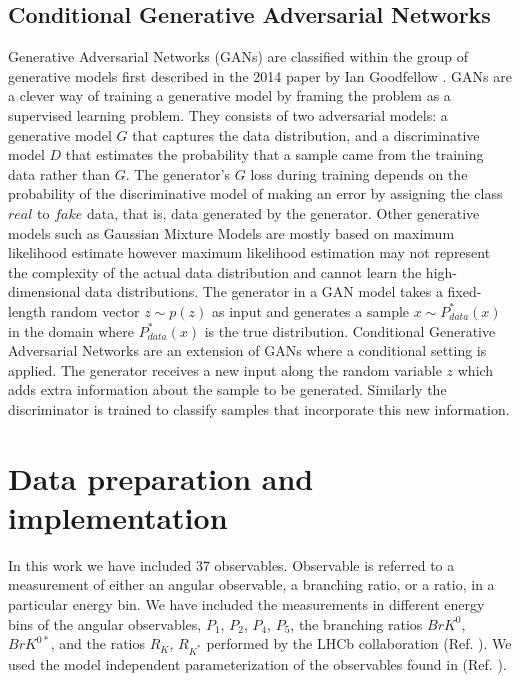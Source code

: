\documentclass[a4paper,fleqn]{cas-dc}
\begin{document}
\subsection{Conditional Generative Adversarial Networks}
Generative Adversarial Networks (GANs) are classified within the group of generative models first described in the 2014 paper by Ian Goodfellow \cite{goodfellow2014generative}. GANs are a clever way of training a generative model by framing the problem as a supervised learning problem. They consists of two adversarial models: a generative model \(G\) that captures the data distribution,
and a discriminative model \(D\) that estimates the probability that a sample came from the training data rather than \(G\). The generator's \(G\) loss during training depends on the probability of the discriminative model of making an error by assigning the class \(\textit{real} \) to \( \textit{fake} \) data, that is, data generated by the generator. Other generative models such as Gaussian Mixture Models are mostly based on maximum likelihood estimate however maximum likelihood estimation may not represent the complexity of the actual data distribution and cannot learn the high-dimensional data distributions. The generator in a GAN model takes a fixed-length random vector \(z \sim p(z) \) as input and generates a sample \(x \sim P^*_{data}(x)\) in the domain where \(P^*_{data}(x)\)  is the true distribution. \newline Conditional Generative Adversarial Networks are an extension of GANs where a conditional setting is applied. The generator receives a new input along the random variable \(z\) which adds extra information about the sample to be generated. Similarly the discriminator is trained to classify samples that incorporate this new information. 





\section{Data preparation and implementation}
In this work we have included 37 observables. Observable is referred to a measurement of either an angular observable, a branching ratio, or a ratio, in a particular energy bin.  We have included the measurements in different energy bins of the angular observables, \(P_1\), \(P_2\), \(P_4\), \(P_5\), the branching ratios \(BrK^0\), \(BrK^{0*}\), and the ratios \(R_K\), \(R_{K^*}\) performed by the LHCb collaboration (Ref. \cite{Aaij_2014}). We used the model independent parameterization of the observables found in (Ref. \cite{Alguero__2019}).
\end{document}
